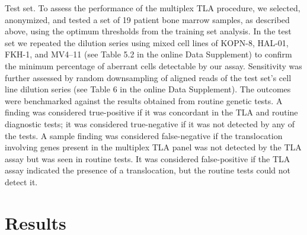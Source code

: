 Test set. To assess the performance of the multiplex TLA procedure, we selected, anonymized, and tested a set of 19 patient bone marrow samples, as described above, using the optimum thresholds from the training set analysis. 
In the test set we repeated the dilution series using mixed cell lines of KOPN-8, HAL-01, FKH-1, and MV4–11 (see Table 5.2 in the online Data Supplement) to confirm the minimum percentage of aberrant cells detectable by our assay.  Sensitivity was further assessed by random downsampling of aligned reads of the test set’s cell line dilution series (see Table 6 in the online Data Supplement). 
The outcomes were benchmarked against the results obtained from routine genetic tests.
A finding was considered true-positive if it was concordant in the TLA and routine diagnostic tests; it was considered true-negative if it was not detected by any of the tests. 
A sample finding was considered false-negative if the translocation involving genes present in the multiplex TLA panel was not detected by the TLA assay but was seen in routine tests. 
It was considered false-positive if the TLA assay indicated the presence of a translocation, but the routine tests could not detect it.


\section{Results}\label{results}

